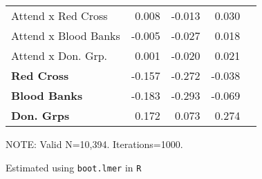\begin{table}
\begin{threeparttable}
\begin{tabularx}{4.5in}{X*{4}{d}}
Attend x Red Cross & 0.008 & -0.013 & 0.030 \\ 
Attend x Blood Banks & -0.005 & -0.027 & 0.018 \\ 
Attend x Don. Grp. & 0.001 & -0.020 & 0.021 \\ 
\textbf{Red Cross} & -0.157 & -0.272 & -0.038 \\ 
\textbf{Blood Banks} & -0.183 & -0.293 & -0.069 \\ 
\textbf{Don. Grps} & 0.172 & 0.073 & 0.274 \\ 
\bottomrule
\end{tabularx}
\begin{tablenotes}
\item \scriptsize{NOTE: Valid N=10,394. Iterations=1000.}
\item \scriptsize{Estimated using \texttt{boot.lmer} in \texttt{R}}
\end{tablenotes}
\end{threeparttable}
\fontsize{10}{15}\selectfont
\end{table}